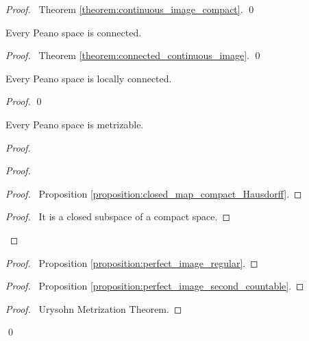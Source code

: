 \begin{proof}
    \pf\ Theorem \ref{theorem:continuous_image_compact}. \qed
\end{proof}

\begin{proposition}
    Every Peano space is connected.
\end{proposition}

\begin{proof}
    \pf\ Theorem \ref{theorem:connected_continuous_image}. \qed
\end{proof}

\begin{proposition}
    Every Peano space is locally connected.
\end{proposition}

\begin{proof}
    \pf
    \qed
\end{proof}

\begin{proposition}
    Every Peano space is metrizable.
\end{proposition}

\begin{proof}
    \pf
    \begin{proof}
        \begin{proof}
            \pf\ Proposition \ref{proposition:closed_map_compact_Hausdorff}.
        \end{proof}
        \begin{proof}
            \pf\ It is a closed subspace of a compact space.
        \end{proof}
    \end{proof}
    \begin{proof}
        \pf\ Proposition \ref{proposition:perfect_image_regular}.
    \end{proof}
    \begin{proof}
        \pf\ Proposition \ref{proposition:perfect_image_second_countable}.
    \end{proof}
    \begin{proof}
        \pf\ Urysohn Metrization Theorem.
    \end{proof}
    \qed
\end{proof}

